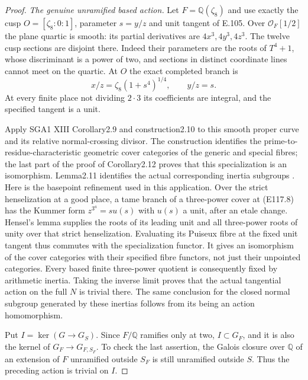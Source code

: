 \begin{proof}
\emph{The genuine unramified based action.}
Let $F=\mathbb Q(\zeta_8)$ and use exactly the cusp
$O=[\zeta_8:0:1]$, parameter $s=y/z$ and unit tangent of
E.105.  Over $\mathcal O_F[1/2]$ the plane quartic is smooth:
its partial derivatives are $4x^3,4y^3,4z^3$.
The twelve cusp sections are disjoint there.  Indeed their
parameters are the roots of $T^4+1$, whose discriminant is
a power of two, and sections in distinct coordinate lines
cannot meet on the quartic.
At $O$ the exact completed branch is
\[
       x/z=\zeta_8(1+s^4)^{1/4},\qquad y/z=s.
 \tag{E117.8}
\]
At every finite place not dividing $2\cdot3$ its coefficients
are integral, and the specified tangent is a unit.

Apply SGA1 XIII Corollary2.9 and construction2.10 to this
smooth proper curve and its relative normal-crossing divisor.
The construction identifies the prime-to-residue-characteristic
geometric cover categories of the generic and special fibres;
the last part of the proof of Corollary2.12 proves that this
specialization is an isomorphism.  Lemma2.11 identifies the
actual corresponding inertia subgroups
\cite[XIII,2.9--2.12 and their proofs]{E_SGA1}.
Here is the basepoint refinement used in this application.
Over the strict henselization at a good place, a tame branch
of a three-power cover at (E117.8) has the Kummer form
$z^{3^a}=s u(s)$ with $u(s)$ a unit, after an etale change.
Hensel's lemma supplies the roots of its leading unit and all
three-power roots of unity over that strict henselization.
Evaluating its Puiseux fibre at the fixed unit tangent thus
commutes with the specialization functor.
It gives an isomorphism of the cover categories with their
specified fibre functors, not just their unpointed categories.
Every based finite three-power quotient is consequently fixed
by arithmetic inertia.  Taking the inverse limit proves that
the actual tangential action on the full $N$ is trivial there.
The same conclusion for the closed normal subgroup generated
by these inertias follows from its being an action homomorphism.

Put $I=\ker(G\to G_S)$.  Since $F/\mathbb Q$ ramifies only
at two, $I\subset G_F$, and it is also the kernel of
$G_F\to G_{F,S_F}$.  To check the last assertion, the Galois
closure over $\mathbb Q$ of an extension of $F$ unramified
outside $S_F$ is still unramified outside $S$.
Thus the preceding action is trivial on $I$.


\end{proof}
